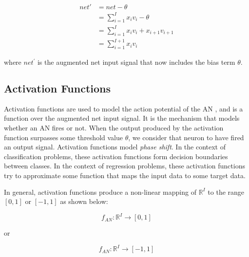 \begin{equation}
    \begin{split}
        net{'} & = net - \theta \\
             & = \sum_{i=1}^{I} x_i v_i - \theta\\
             & = \sum_{i=1}^{I} x_i v_i + x_{i+1} v_{i+1} \\
             & = \sum_{i=1}^{I+1} x_i v_i
    \label{eq:augmented_vectors}
    \end{split}
\end{equation}

\noindent where $\textit{net}^{'}$ is the augmented net input signal that now
includes the bias term $\theta$.


\subsection{Activation Functions}
\label{sec:anns:an:act_functions}

Activation functions are used to model the action
potential of the \ac{AN} \cite{ref:ziv:1994, ref:hodgkin:1952}, and is
a function over the augmented net input signal. It is
the mechanism that models whether an \ac{AN} fires or not. When the
output produced by the activation function surpasses some threshold value
$\theta$, we consider that neuron to have fired an output signal.
Activation functions model \textit{phase shift}. In
the context of classification problems, these activation functions form decision boundaries between classes. In the
context of regression problems, these activation
functions try to approximate some function that maps the input data to some
target data.

In general, activation functions produce a non-linear mapping of
$\mathbb{R}^{I}$ to the range $[0,1]$ or $[-1,1]$ as shown below:

\begin{equation}
    f_{AN}: \mathbb{R}^{I} \rightarrow [0,1]
    \label{eq:an_function_mapping_0_1}
\end{equation}

\noindent or

\begin{equation}
    f_{AN}: \mathbb{R}^{I} \rightarrow [-1,1]
    \label{eq:an_function_mapping_minus_1_1}
\end{equation}

